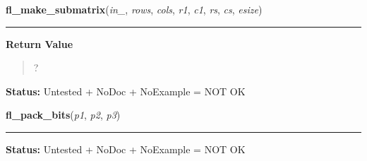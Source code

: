     \label{xformslib:library:fl_make_submatrix}

    \vspace{0.5ex}

\hspace{.8\funcindent}\begin{boxedminipage}{\funcwidth}

    \raggedright \textbf{fl\_make\_submatrix}(\textit{in\_}, \textit{rows}, \textit{cols}, \textit{r1}, \textit{c1}, \textit{rs}, \textit{cs}, \textit{esize})

    \vspace{-1.5ex}

    \rule{\textwidth}{0.5\fboxrule}
\setlength{\parskip}{2ex}
\setlength{\parskip}{1ex}
      \textbf{Return Value}
    \vspace{-1ex}

      \begin{quote}
      ?

      \end{quote}

\textbf{Status:} Untested + NoDoc + NoExample = NOT OK



    \end{boxedminipage}

    \label{xformslib:library:fl_pack_bits}

    \vspace{0.5ex}

\hspace{.8\funcindent}\begin{boxedminipage}{\funcwidth}

    \raggedright \textbf{fl\_pack\_bits}(\textit{p1}, \textit{p2}, \textit{p3})

    \vspace{-1.5ex}

    \rule{\textwidth}{0.5\fboxrule}
\setlength{\parskip}{2ex}
\setlength{\parskip}{1ex}
\textbf{Status:} Untested + NoDoc + NoExample = NOT OK



    \end{boxedminipage}

    \label{xformslib:library:fl_unpack_bits}

